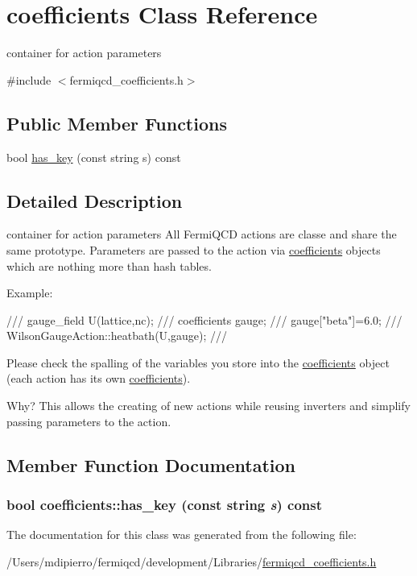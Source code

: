 \hypertarget{classcoefficients}{
\section{coefficients Class Reference}
\label{classcoefficients}
}


container for action parameters  


{\ttfamily \#include $<$fermiqcd\_\-coefficients.h$>$}\subsection*{Public Member Functions}
\begin{DoxyCompactItemize}
\item 
bool \hyperlink{classcoefficients_a8c1deef53017a13f3307d6af968f80d4}{has\_\-key} (const string s) const 
\end{DoxyCompactItemize}


\subsection{Detailed Description}
container for action parameters All FermiQCD actions are classe and share the same prototype. Parameters are passed to the action via \hyperlink{classcoefficients}{coefficients} objects which are nothing more than hash tables.

Example: \begin{DoxyVerb}
///    gauge_field U(lattice,nc);
///    coefficients gauge;
///    gauge["beta"]=6.0;
///    WilsonGaugeAction::heatbath(U,gauge);
/// \end{DoxyVerb}
 Please check the spalling of the variables you store into the \hyperlink{classcoefficients}{coefficients} object (each action has its own \hyperlink{classcoefficients}{coefficients}).

Why? This allows the creating of new actions while reusing inverters and simplify passing parameters to the action. 

\subsection{Member Function Documentation}
\hypertarget{classcoefficients_a8c1deef53017a13f3307d6af968f80d4}{
\subsubsection[{has\_\-key}]{\setlength{\rightskip}{0pt plus 5cm}bool coefficients::has\_\-key (const string {\em s}) const}}
\label{classcoefficients_a8c1deef53017a13f3307d6af968f80d4}


The documentation for this class was generated from the following file:\begin{DoxyCompactItemize}
\item 
/Users/mdipierro/fermiqcd/development/Libraries/\hyperlink{fermiqcd__coefficients_8h}{fermiqcd\_\-coefficients.h}\end{DoxyCompactItemize}
